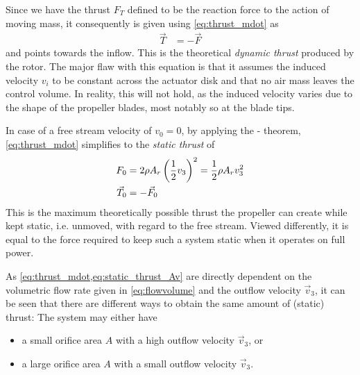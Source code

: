 Since we have the thrust $F_T$ defined to be the reaction force to the action of moving mass, it consequently is given using \cref{eq:thrust_mdot} as
%
\begin{align}
\vec{T} &= -\vec{F} \label{eq:thrust}
\end{align}
%
and points towards the inflow. 
This is the theoretical \textit{dynamic thrust} produced by the rotor. 
The major flaw with this equation is that it assumes the induced velocity $v_i$ to be constant across the actuator disk and that no air mass leaves the control volume.
In reality, this will not hold, as the induced velocity varies due to the shape of the propeller blades, most notably so at the blade tips.


In case of a free stream velocity of $v_0 = 0$, by applying the - theorem, \cref{eq:thrust_mdot} simplifies to the \textit{static thrust} of
%
\begin{align}
F_{0} &= 2 \rho A_r \left(\frac{1}{2}v_3\right)^2
       = \frac{1}{2} \rho A_r v_3^2 \label{eq:static_thrust_Av} \\
\vec{T}_{0} &= -\vec{F}_{0}
\end{align}
%
This is the maximum theoretically possible thrust the propeller can create while kept static, i.e. unmoved, with regard to the free stream. 
Viewed differently, it is equal to the force required to keep such a system static when it operates on full power.


As \cref{eq:thrust_mdot,eq:static_thrust_Av} are directly dependent on the volumetric flow rate given in \cref{eq:flowvolume} and the outflow velocity $\vec{v}_3$, 
it can be seen that there are different ways to obtain the same amount of (static) thrust: The system may either have

\begin{itemize}
	\item a small orifice area $A$ with a high outflow velocity $\vec{v}_{3}$, or
	\item a large orifice area $A$ with a small outflow velocity $\vec{v}_{3}$.
\end{itemize}

